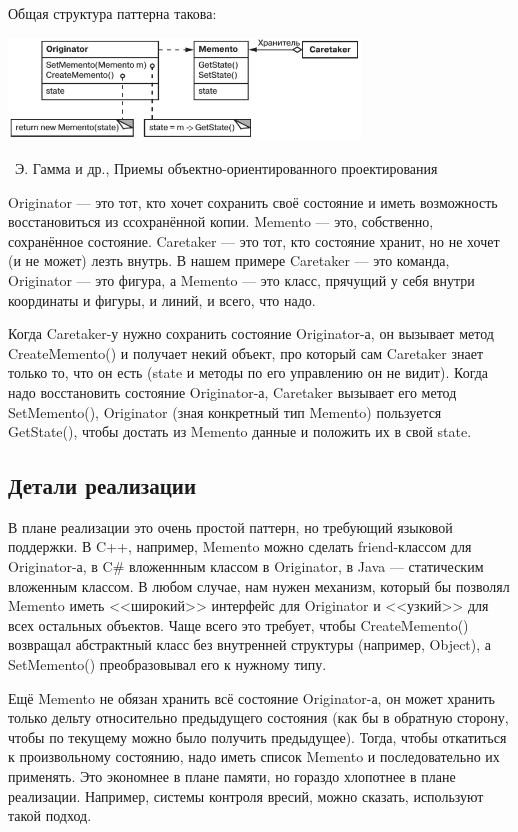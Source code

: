 \documentclass[a5paper]{article}
\newcommand{\attribution}[1] {
    \vspace{-5mm}\begin{flushright}\begin{scriptsize}%
    {\textcopyright\, #1}\end{scriptsize}\end{flushright}
}
\begin{document}
Общая структура паттерна такова:

\begin{center}
    \includegraphics[width=0.7\textwidth]{memento.png}
    \attribution{Э. Гамма и др., Приемы объектно-ориентированного проектирования}
\end{center}

Originator --- это тот, кто хочет сохранить своё состояние и иметь возможность восстановиться из ссохранённой копии. Memento --- это, собственно, сохранённое состояние. Caretaker --- это тот, кто состояние хранит, но не хочет (и не может) лезть внутрь. В нашем примере Caretaker --- это команда, Originator --- это фигура, а Memento --- это класс, прячущий у себя внутри координаты и фигуры, и линий, и всего, что надо.

Когда Caretaker-у нужно сохранить состояние Originator-а, он вызывает метод CreateMemento() и получает некий объект, про который сам Caretaker знает только то, что он есть (state и методы по его управлению он не видит). Когда надо восстановить состояние Originator-а, Caretaker вызывает его метод SetMemento(), Originator (зная конкретный тип Memento) пользуется GetState(), чтобы достать из Memento данные и положить их в свой state.

\subsection{Детали реализации}

В плане реализации это очень простой паттерн, но требующий языковой поддержки. В C++, например, Memento можно сделать friend-классом для Originator-а, в C\# вложеннным классом в Originator, в Java --- статическим вложенным классом. В любом случае, нам нужен механизм, который бы позволял Memento иметь <<широкий>> интерфейс для Originator и <<узкий>> для всех остальных объектов. Чаще всего это требует, чтобы CreateMemento() возвращал абстрактный класс без внутренней структуры (например, Object), а SetMemento() преобразовывал его к нужному типу.

Ещё Memento не обязан хранить всё состояние Originator-а, он может хранить только дельту относительно предыдущего состояния (как бы в обратную сторону, чтобы по текущему можно было получить предыдущее). Тогда, чтобы откатиться к произвольному состоянию, надо иметь список Memento и последовательно их применять. Это экономнее в плане памяти, но гораздо хлопотнее в плане реализации. Например, системы контроля вресий, можно сказать, используют такой подход.
\end{document}

